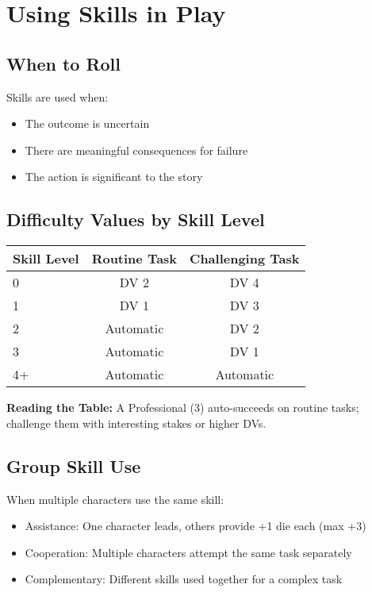 \documentclass[11pt,twoside,openany]{book}
\begin{document}
\section*{Using Skills in Play} 

\subsection*{When to Roll}

Skills are used when:
\begin{itemize}
\item The outcome is uncertain
\item There are meaningful consequences for failure
\item The action is significant to the story
\end{itemize}

\subsection*{Difficulty Values by Skill Level}

\begin{center}
\begin{tabular}{|l|c|c|}
\hline
\textbf{Skill Level} & \textbf{Routine Task} & \textbf{Challenging Task} \\
\hline
0 & DV 2 & DV 4 \\
1 & DV 1 & DV 3 \\
2 & Automatic & DV 2 \\
3 & Automatic & DV 1 \\
4+ & Automatic & Automatic \\
\hline
\end{tabular}
\end{center}

\textbf{Reading the Table:} A Professional (3) auto-succeeds on routine tasks; challenge them with interesting stakes or higher DVs.

\subsection*{Group Skill Use}

When multiple characters use the same skill:
\begin{itemize}
\item Assistance: One character leads, others provide +1 die each (max +3)
\item Cooperation: Multiple characters attempt the same task separately
\item Complementary: Different skills used together for a complex task
\end{itemize}
\end{document}
